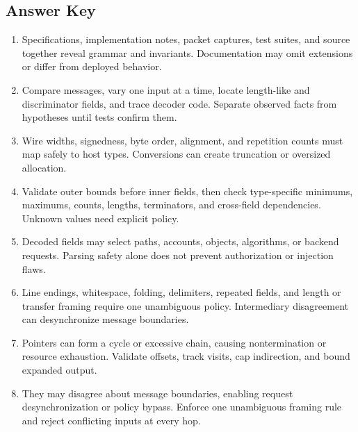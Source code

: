 \documentclass[11pt,letterpaper]{article}
\begin{document}
\subsection*{Answer Key}
\begin{enumerate}
\item Specifications, implementation notes, packet captures, test suites, and source together reveal grammar and invariants. Documentation may omit extensions or differ from deployed behavior.
\item Compare messages, vary one input at a time, locate length-like and discriminator fields, and trace decoder code. Separate observed facts from hypotheses until tests confirm them.
\item Wire widths, signedness, byte order, alignment, and repetition counts must map safely to host types. Conversions can create truncation or oversized allocation.
\item Validate outer bounds before inner fields, then check type-specific minimums, maximums, counts, lengths, terminators, and cross-field dependencies. Unknown values need explicit policy.
\item Decoded fields may select paths, accounts, objects, algorithms, or backend requests. Parsing safety alone does not prevent authorization or injection flaws.
\item Line endings, whitespace, folding, delimiters, repeated fields, and length or transfer framing require one unambiguous policy. Intermediary disagreement can desynchronize message boundaries.
\item Pointers can form a cycle or excessive chain, causing nontermination or resource exhaustion. Validate offsets, track visits, cap indirection, and bound expanded output.
\item They may disagree about message boundaries, enabling request desynchronization or policy bypass. Enforce one unambiguous framing rule and reject conflicting inputs at every hop.
\end{enumerate}
\end{document}
